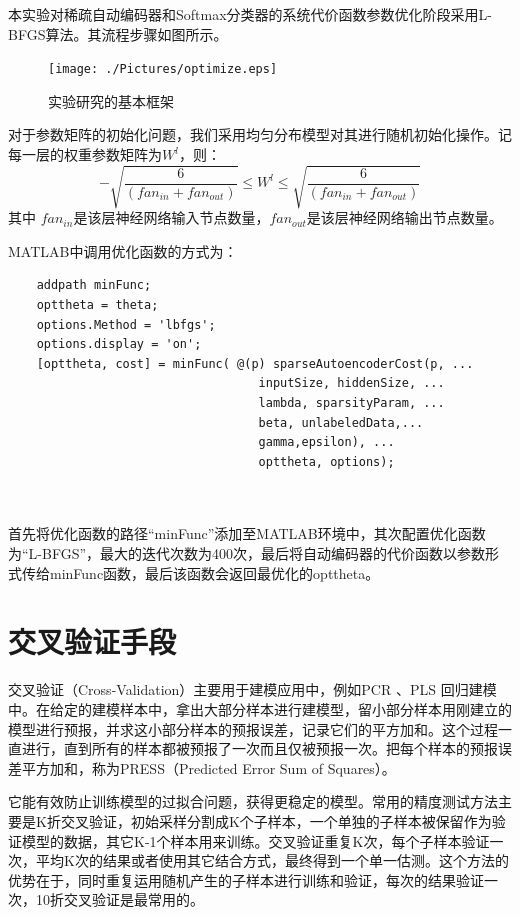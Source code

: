 \documentclass[oneside]{ZJUthesis}
\begin{document}
本实验对稀疏自动编码器和Softmax分类器的系统代价函数参数优化阶段采用L-BFGS算法\cite{nocedal1980updating,liu1989limited}。其流程步骤如图所示。
\begin{figure}[h]
\centering
\texttt{[image: ./Pictures/optimize.eps]}
\caption{实验研究的基本框架\label{fig:framework}}
\end{figure}
对于参数矩阵的初始化问题，我们采用均匀分布模型对其进行随机初始化操作。记每一层的权重参数矩阵为$W^l$，则：
\begin{equation}
  -\sqrt{\frac{6}{(fan_{in} + fan_{out})}} \le W^l \le \sqrt{\frac{6}{(fan_{in} + fan_{out})}}
\end{equation}
其中 $fan_{in}$是该层神经网络输入节点数量，$fan_{out}$是该层神经网络输出节点数量。

MATLAB中调用优化函数的方式为：
\begin{verbatim}
    addpath minFunc;
    opttheta = theta; 
    options.Method = 'lbfgs';
    options.display = 'on';
    [opttheta, cost] = minFunc( @(p) sparseAutoencoderCost(p, ...
                                   inputSize, hiddenSize, ...
                                   lambda, sparsityParam, ...
                                   beta, unlabeledData,...
                                   gamma,epsilon), ...
                                   opttheta, options);
      
    
\end{verbatim}
首先将优化函数的路径``minFunc''添加至MATLAB环境中，其次配置优化函数为``L-BFGS''，最大的迭代次数为400次，最后将自动编码器的代价函数以参数形式传给minFunc函数，最后该函数会返回最优化的opttheta。

\section{交叉验证手段}
交叉验证（Cross-Validation）主要用于建模应用中，例如PCR 、PLS 回归建模中。在给定的建模样本中，拿出大部分样本进行建模型，留小部分样本用刚建立的模型进行预报，并求这小部分样本的预报误差，记录它们的平方加和。这个过程一直进行，直到所有的样本都被预报了一次而且仅被预报一次。把每个样本的预报误差平方加和，称为PRESS（Predicted Error Sum of Squares）。

它能有效防止训练模型的过拟合问题，获得更稳定的模型。常用的精度测试方法主要是K折交叉验证，初始采样分割成K个子样本，一个单独的子样本被保留作为验证模型的数据，其它K-1个样本用来训练。交叉验证重复K次，每个子样本验证一次，平均K次的结果或者使用其它结合方式，最终得到一个单一估测。这个方法的优势在于，同时重复运用随机产生的子样本进行训练和验证，每次的结果验证一次，10折交叉验证是最常用的。
\end{document}
